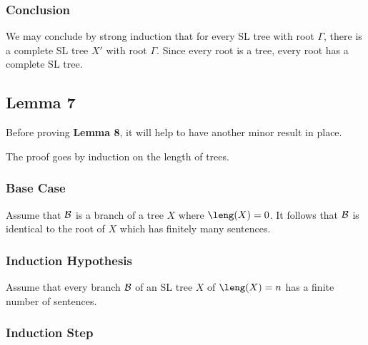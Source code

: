 \subsubsection{Conclusion}

We may conclude by strong induction that for every SL tree with root $\Gamma$, there is a complete SL tree $X'$ with root $\Gamma$. 
Since every root is a tree, every root has a complete SL tree.





\subsection{Lemma 7}

Before proving \textbf{Lemma 8}, it will help to have another minor result in place.

\label{FiniteLengthLemma}

The proof goes by induction on the length of trees.

\subsubsection{Base Case}

Assume that $\mathcal{B}$ is a branch of a tree $X$ where $\leng(X)=0$. 
It follows that $\mathcal{B}$ is identical to the root of $X$ which has finitely many sentences. 

\subsubsection{Induction Hypothesis}

Assume that every branch $\mathcal{B}$ of an SL tree $X$ of $\leng(X)=n$ has a finite number of sentences.

\subsubsection{Induction Step}

